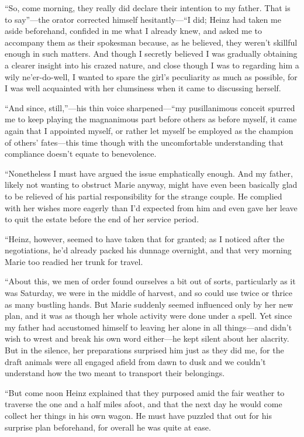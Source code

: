 \documentclass[12pt,a4paper]{article}
\begin{document}
“So, come morning, they really did declare their intention to my father. That is to say”—the orator corrected himself hesitantly—“I did; Heinz had taken me aside beforehand, confided in me what I already knew, and asked me to accompany them as their spokesman because, as he believed, they weren’t skillful enough in such matters. And though I secretly believed I was gradually obtaining a clearer insight into his crazed nature, and close though I was to regarding him a wily ne’er-do-well, I wanted to spare the girl’s peculiarity as much as possible, for I was well acquainted with her clumsiness when it came to discussing herself.

“And since, still,”—his thin voice sharpened—“my pusillanimous conceit spurred me to keep playing the magnanimous part before others as before myself, it came again that I appointed myself, or rather let myself be employed as the champion of others’ fates—this time though with the uncomfortable understanding that compliance doesn’t equate to benevolence.

“Nonetheless I must have argued the issue emphatically enough. And my father, likely not wanting to obstruct Marie anyway, might have even been basically glad to be relieved of his partial responsibility for the strange couple. He complied with her wishes more eagerly than I’d expected from him and even gave her leave to quit the estate before the end of her service period.

“Heinz, however, seemed to have taken that for granted; as I noticed after the negotiations, he’d already packed his dunnage overnight, and that very morning Marie too readied her trunk for travel.

“About this, we men of order found ourselves a bit out of sorts, particularly as it was Saturday, we were in the middle of harvest, and so could use twice or thrice as many bustling hands. But Marie suddenly seemed influenced only by her new plan, and it was as though her whole activity were done under a spell. Yet since my father had accustomed himself to leaving her alone in all things—and didn’t wish to wrest and break his own word either—he kept silent about her alacrity. But in the silence, her preparations surprised him just as they did me, for the draft animals were all engaged afield from dawn to dusk and we couldn’t understand how the two meant to transport their belongings.

“But come noon Heinz explained that they purposed amid the fair weather to traverse the one and a half miles afoot, and that the next day he would come collect her things in his own wagon. He must have puzzled that out for his surprise plan beforehand, for overall he was quite at ease.
\end{document}
